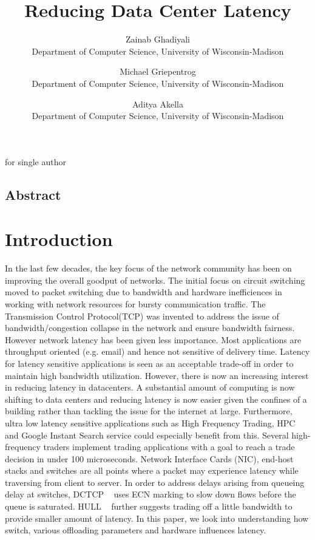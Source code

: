 \date{} 
\usepackage{usenix} 
\title{
\Large 
\bf Reducing Data Center Latency
}

for single author \author{ 
{\rm Zainab Ghadiyali}\\ Department of Computer
Science, University of Wisconsin-Madison 
\and {\rm Michael Griepentrog}\\
Department of Computer Science, University of Wisconsin-Madison 
\and{\rm Aditya Akella}\\
Department of Computer Science, University of Wisconsin-Madison
} 


\maketitle

\thispagestyle{empty}


\subsection*{Abstract}

\section{Introduction} 
In the last few decades, the key focus of the network
community has been on improving the overall goodput of networks. The initial
focus on circuit switching moved to packet switching due to bandwidth and
hardware inefficiences in working with network resources for
bursty communication traffic. The Transmission Control Protocol(TCP) was
invented to address the issue of bandwidth/congestion collapse in the network
and ensure bandwidth fairness.~\cite{DCTCP,Queueing,TCP_Pacing} However network
latency has been given less importance. Most applications are throughput
oriented (e.g. email) and hence not sensitive of delivery time. Latency for
latency sensitive applications is seen as an acceptable trade-off in order to
maintain high bandwidth utilization.   
However, there is now an increasing interest in reducing latency in
datacenters. A substantial amount of computing is now shifting to data centers
and reducing latency is now easier given the confines of a building rather than
tackling the issue for the internet at large. Furthermore, ultra low latency
 sensitive applications such as High Frequency Trading, HPC and Google Instant 
Search service could especially benefit from this.
Several high-frequency traders implement trading applications with a goal to reach a
trade decision in under 100 microseconds. 
Network Interface Cards (NIC), end-host stacks and switches are all points 
where a packet may experience latency while traversing from client to server. 
In order to address delays arising from queueing delay at switches, 
DCTCP ~\cite{DCTCP} uses ECN marking to slow down flows before the queue is 
saturated. HULL ~\cite{HULL} further suggests trading off a little bandwidth to 
provide smaller amount of latency.  
In this paper, we look into understanding how switch, various offloading
parameters and hardware influences latency.

